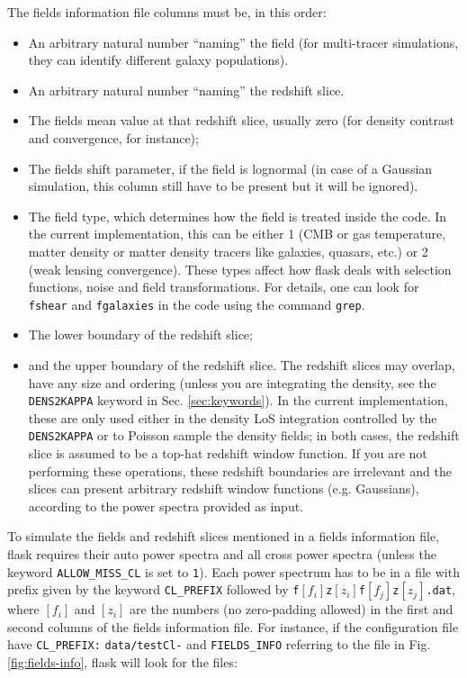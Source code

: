 \documentclass[12pt]{book} %
\begin{document}
The fields information file columns must be, in this order:
\begin{itemize}
\item An arbitrary natural number ``naming'' the field (for multi-tracer simulations, they can identify 
  different galaxy populations).
\item An arbitrary natural number ``naming'' the redshift slice.
\item The fields mean value at that redshift slice, usually zero (for density contrast and convergence, for instance);
\item The fields shift parameter, if the field is lognormal (in case of a Gaussian simulation, this column 
  still have to be present but it will be ignored).
\item The field type, which determines how the field is treated inside the code. In the current 
  implementation, this can be either 1 (CMB or gas temperature, matter density or matter density tracers like 
  galaxies, quasars, etc.) or 2 (weak lensing convergence). These types affect how {\sc flask} deals with 
  selection functions, noise and field transformations. For details, one can look for {\tt fshear} and 
  {\tt fgalaxies} in the code using the command {\tt grep}.
\item The lower boundary of the redshift slice;
\item and the upper boundary of the redshift slice. The redshift slices may overlap, have any size and ordering 
  (unless you are integrating the density, see the {\tt DENS2KAPPA} keyword in Sec. \ref{sec:keywords}). 
  In the current implementation, these are only used either in the density LoS integration controlled by the {\tt DENS2KAPPA} 
  or to Poisson sample the density fields; in both cases, the redshift slice is assumed to be a top-hat 
  redshift window function. If you are not performing these operations, these redshift boundaries are 
  irrelevant and the slices can present arbitrary redshift window functions (e.g. Gaussians), according to 
  the power spectra provided as input.
\end{itemize}

To simulate the fields and redshift slices mentioned in a fields information file, 
{\sc flask} requires their auto power spectra and all cross power spectra (unless 
the keyword {\tt ALLOW\_MISS\_CL} is set to {\tt 1}). Each power spectrum has to 
be in a file with prefix given by the keyword {\tt CL\_PREFIX} followed by 
{\tt f}$[f_i]${\tt z}$[z_i]${\tt f}$[f_j]${\tt z}$[z_j]${\tt .dat}, where 
$[f_i]$ and $[z_i]$ are the numbers (no zero-padding allowed) in the first and 
second columns of the fields information file. For instance, if 
the configuration file have {\tt CL\_PREFIX:} {\tt data/testCl-} and 
{\tt FIELDS\_INFO} referring to the file in Fig. \ref{fig:fields-info}, 
{\sc flask} will look for the files:
\end{document}
